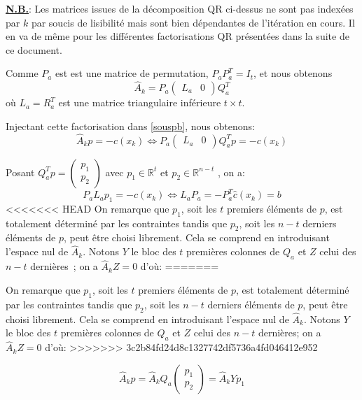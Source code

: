 \documentclass[a4paper,11pt]{article}
\newcommand{\real}{\mathbb{R}}
\newcommand{\ha}{\hat{A}}
\newcommand{\hc}{\hat{c}}
\numberwithin{equation}{section}
\newif\ifnotes\notestrue
\def\boxnote#1#2{\ifnotes\fbox{\footnote{\ }}\ \footnotetext{ From #1: #2}\fi}
\def\fabian#1{\boxnote{Fabian}{\color{blue}#1}}
\begin{document}
\textbf{\underline{N.B.}}: Les matrices issues de la décomposition QR ci-dessus ne sont pas indexées par $k$ par soucis de lisibilité mais sont bien dépendantes de l'itération en cours. Il en va de même pour les différentes factorisations QR présentées dans la suite de ce document.

Comme $P_{a}$ est est une matrice de permutation, $P_{a}P_{a}^{T} = I_{t}$, et nous obtenons
\begin{equation}
\ha_{k} = P_{a}
\begin{pmatrix}
L_{a} & 0
\end{pmatrix}
Q_{a}^{T}
\end{equation}
où $L_{a}=R_{a}^{T}$ est une matrice triangulaire inférieure $t \times t$.

Injectant cette factorisation dans \eqref{souspb}, nous obtenons: 
\[
\ha_{k}p = -c(x_{k}) \Longleftrightarrow P_{a}\begin{pmatrix}
L_{a} & 0
\end{pmatrix}
Q_{a}^{T}p = -c(x_{k})
\]

Posant $Q_{a}^{T}p = \begin{pmatrix}
p_{1} \\ p_{2}
\end{pmatrix}$ avec $p_{1} \in \real^{t}$ et $p_{2} \in \real^{n-t}$ , on a:
\[
P_{a}L_{a}p_{1} = -\hc(x_{k}) \Longleftrightarrow L_{a}P_{a} = -P_{a}^{T}\hc(x_{k}) = b
\]
<<<<<<< HEAD
On remarque que $p_{1}$, soit les $t$ premiers éléments de $p$, est totalement déterminé par les contraintes tandis que $p_{2}$, soit les $n-t$ derniers éléments de $p$, peut être choisi librement. Cela se comprend en introduisant l'espace nul de $\ha_{k}$. Notons $Y$ le bloc des $t$ premières colonnes de $Q_{a}$ et $Z$ celui des $n-t$ dernières\fabian{de (2.7)?};  on a $\ha_{k}Z=0$ d'où:
=======

On remarque que $p_{1}$, soit les $t$ premiers éléments de $p$, est totalement déterminé par les contraintes tandis que $p_{2}$, soit les $n-t$ derniers éléments de $p$, peut être choisi librement. Cela se comprend en introduisant l'espace nul de $\ha_{k}$. Notons $Y$ le bloc des $t$ premières colonnes de $Q_{a}$ et $Z$ celui des $n-t$ dernières;  on a $\ha_{k}Z=0$ d'où:
>>>>>>> 3c2b84fd24d8c1327742df5736a4fd046412e952

$$
\ha_{k}p = \ha_{k}Q_{a} \begin{pmatrix}
p_{1}\\p_{2}
\end{pmatrix}=\ha_{k}Yp_{1}
$$
\end{document}
